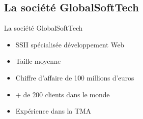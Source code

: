 \subsection{La société GlobalSoftTech}
	\begin{frame}{La société GlobalSoftTech}
		\begin{itemize}
			\item SSII spécialisée développement Web
			\item Taille moyenne
			\item Chiffre d'affaire de 100 millions d'euros
			\item + de 200 clients dans le monde
			\item Expérience dans la TMA
		\end{itemize}
	\end{frame}